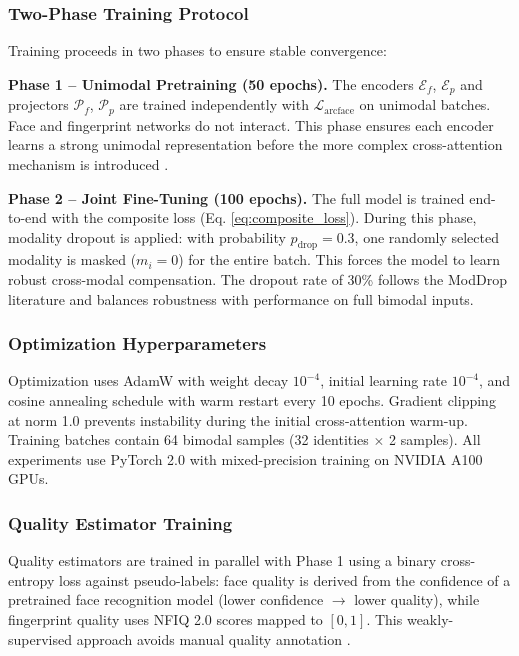 \documentclass[10pt,journal,compsoc]{IEEEtran}
\begin{document}
\subsubsection{Two-Phase Training Protocol}

Training proceeds in two phases to ensure stable convergence:

\textbf{Phase 1 -- Unimodal Pretraining (50 epochs).} The encoders $\mathcal{E}_f$, $\mathcal{E}_p$ and projectors $\mathcal{P}_f$, $\mathcal{P}_p$ are trained independently with $\mathcal{L}_{\text{arcface}}$ on unimodal batches. Face and fingerprint networks do not interact. This phase ensures each encoder learns a strong unimodal representation before the more complex cross-attention mechanism is introduced \cite{dan2023transface, grosz2024afrnet}.

\textbf{Phase 2 -- Joint Fine-Tuning (100 epochs).} The full model is trained end-to-end with the composite loss (Eq. \ref{eq:composite_loss}). During this phase, modality dropout \cite{neverova2016moddrop} is applied: with probability $p_{\text{drop}} = 0.3$, one randomly selected modality is masked ($m_i = 0$) for the entire batch. This forces the model to learn robust cross-modal compensation. The dropout rate of 30\% follows the ModDrop literature \cite{neverova2016moddrop} and balances robustness with performance on full bimodal inputs.

\subsubsection{Optimization Hyperparameters}

Optimization uses AdamW \cite{loshchilov2018decoupled} with weight decay $10^{-4}$, initial learning rate $10^{-4}$, and cosine annealing schedule \cite{loshchilov2016sgdr} with warm restart every 10 epochs. Gradient clipping at norm 1.0 prevents instability during the initial cross-attention warm-up. Training batches contain 64 bimodal samples (32 identities $\times$ 2 samples). All experiments use PyTorch 2.0 with mixed-precision training on NVIDIA A100 GPUs.

\subsubsection{Quality Estimator Training}

Quality estimators are trained in parallel with Phase 1 using a binary cross-entropy loss against pseudo-labels: face quality is derived from the confidence of a pretrained face recognition model (lower confidence $\rightarrow$ lower quality), while fingerprint quality uses NFIQ 2.0 scores mapped to $[0, 1]$. This weakly-supervised approach avoids manual quality annotation \cite{soleymani2021quality}.
\end{document}
